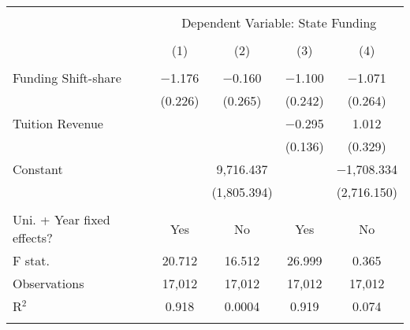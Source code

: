 
\begin{tabular}{@{\extracolsep{5pt}}lcccc} 
\\[-1.8ex]\hline 
\hline \\[-1.8ex] 
 & \multicolumn{4}{c}{Dependent Variable: State Funding} \\ 
\cline{2-5} 
\\[-1.8ex] & (1) & (2) & (3) & (4)\\ 
\hline \\[-1.8ex] 
 Funding Shift-share& $-$1.176 & $-$0.160 & $-$1.100 & $-$1.071 \\ 
  & (0.226) & (0.265) & (0.242) & (0.264) \\ 
  Tuition Revenue &  &  & $-$0.295 & 1.012 \\ 
  &  &  & (0.136) & (0.329) \\ 
  Constant &  & 9,716.437 &  & $-$1,708.334 \\ 
  &  & (1,805.394) &  & (2,716.150) \\ 
 \hline \\[-1.8ex] 
Uni. + Year fixed effects? & Yes & No & Yes & No \\ 
F stat. & 20.712 & 16.512 & 26.999 & 0.365 \\ 
Observations & 17,012 & 17,012 & 17,012 & 17,012 \\ 
R$^{2}$ & 0.918 & 0.0004 & 0.919 & 0.074 \\ 
\hline 
\hline \\[-1.8ex] 
\end{tabular} 
